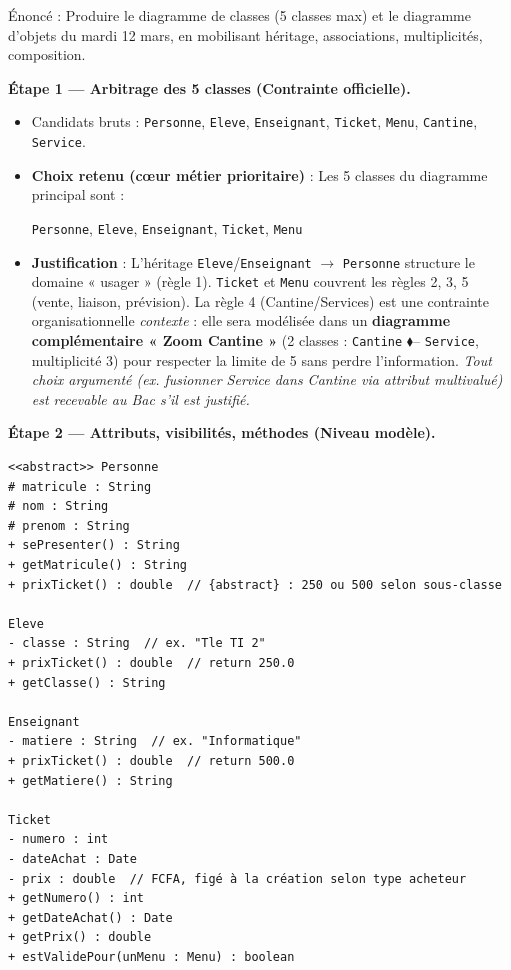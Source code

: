 \documentclass[11pt]{article}
\begin{document}
\begin{exoresolu}
Énoncé : Produire le diagramme de classes (5 classes max) et le diagramme d'objets du mardi 12 mars, en mobilisant héritage, associations, multiplicités, composition.
\tcblower

\textbf{Étape 1 — Arbitrage des 5 classes (Contrainte officielle).}
\begin{itemize}
  \item Candidats bruts : \texttt{Personne}, \texttt{Eleve}, \texttt{Enseignant}, \texttt{Ticket}, \texttt{Menu}, \texttt{Cantine}, \texttt{Service}.
  \item \textbf{Choix retenu (cœur métier prioritaire)} : Les 5 classes du diagramme principal sont :
  \begin{center}
  \texttt{Personne}, \texttt{Eleve}, \texttt{Enseignant}, \texttt{Ticket}, \texttt{Menu}
  \end{center}
  \item \textbf{Justification} : L'héritage \texttt{Eleve}/\texttt{Enseignant} $\rightarrow$ \texttt{Personne} structure le domaine « usager » (règle 1). \texttt{Ticket} et \texttt{Menu} couvrent les règles 2, 3, 5 (vente, liaison, prévision). La règle 4 (Cantine/Services) est une contrainte organisationnelle \emph{contexte} : elle sera modélisée dans un \textbf{diagramme complémentaire « Zoom Cantine »} (2 classes : \texttt{Cantine} $\blacklozenge$-- \texttt{Service}, multiplicité 3) pour respecter la limite de 5 sans perdre l'information. \emph{Tout choix argumenté (ex. fusionner Service dans Cantine via attribut multivalué) est recevable au Bac s'il est justifié.}
\end{itemize}

\textbf{Étape 2 — Attributs, visibilités, méthodes (Niveau modèle).}

\begin{lstlisting}[language=text]
<<abstract>> Personne
# matricule : String
# nom : String
# prenom : String
+ sePresenter() : String
+ getMatricule() : String
+ prixTicket() : double  // {abstract} : 250 ou 500 selon sous-classe

Eleve
- classe : String  // ex. "Tle TI 2"
+ prixTicket() : double  // return 250.0
+ getClasse() : String

Enseignant
- matiere : String  // ex. "Informatique"
+ prixTicket() : double  // return 500.0
+ getMatiere() : String

Ticket
- numero : int
- dateAchat : Date
- prix : double  // FCFA, figé à la création selon type acheteur
+ getNumero() : int
+ getDateAchat() : Date
+ getPrix() : double
+ estValidePour(unMenu : Menu) : boolean


\end{lstlisting}
\end{exoresolu}
\end{document}

